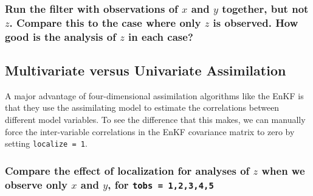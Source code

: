 

\subsubsection{Run the filter with observations of $x$ and $y$ together, but not $z$. Compare this to the case where only $z$ is observed. How good is the analysis of $z$ in each case?}  


\subsection{Multivariate versus Univariate Assimilation}

A major advantage of four-dimensional assimilation algorithms like the EnKF is that they use the assimilating model to estimate the correlations between different model variables.
To see the difference that this makes, we can manually force the inter-variable correlations in the EnKF covariance matrix to zero by setting \texttt{localize = 1}. 

\subsubsection{Compare the effect of localization for analyses of $z$ when we observe only $x$ and $y$, for \texttt{tobs = 1,2,3,4,5}}  



